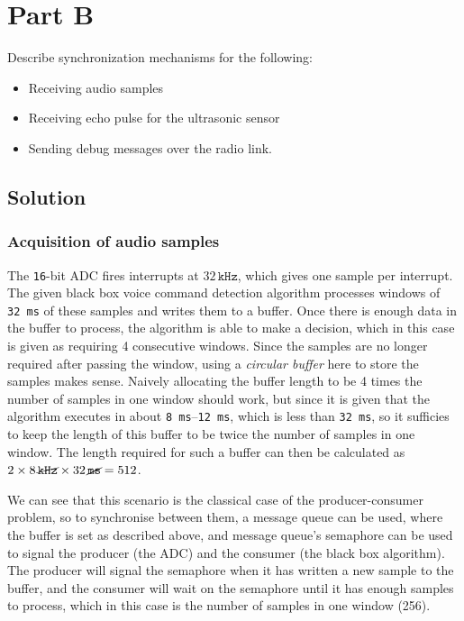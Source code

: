 \section*{Part B}

Describe synchronization mechanisms for the following:
\begin{itemize}[noitemsep, topsep=0pt]
    \item Receiving audio samples
    \item Receiving echo pulse for the ultrasonic sensor
    \item Sending debug messages over the radio link.
\end{itemize}

\subsection*{Solution}

\subsubsection*{Acquisition of audio samples}

The \texttt{16}-bit ADC fires interrupts at \( 32\,\texttt{kHz} \), which gives one sample per interrupt.
The given black box voice command detection algorithm processes windows of \texttt{32\,ms} of these samples and writes them to a buffer.
Once there is enough data in the buffer to process, the algorithm is able to make a decision, which in this case is given as requiring 4 consecutive windows.
Since the samples are no longer required after passing the window, using a \textit{circular buffer} here to store the samples makes sense.
Naively allocating the buffer length to be 4 times the number of samples in one window should work, but since it is given that the algorithm executes in about \texttt{8\,ms}--\texttt{12\,ms}, which is less than \texttt{32\,ms}, so it sufficies to keep the length of this buffer to be twice the number of samples in one window.
The length required for such a buffer can then be calculated as \( 2 \times 8\,\cancel{\texttt{kHz}} \times 32\,\cancel{\texttt{ms}} = 512 \).

We can see that this scenario is the classical case of the producer-consumer problem, so to synchronise between them, a message queue can be used, where the buffer is set as described above, and message queue's semaphore can be used to signal the producer (the ADC) and the consumer (the black box algorithm).
The producer will signal the semaphore when it has written a new sample to the buffer, and the consumer will wait on the semaphore until it has enough samples to process, which in this case is the number of samples in one window (256).

